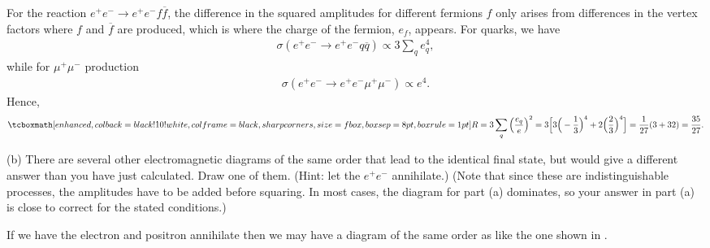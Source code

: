 For the reaction $e^{+}e^{-} \rightarrow e^{+}e^{-}f\overline{f}$, the difference in the squared amplitudes for different fermions $f$ only arises from differences in the vertex factors where $f$ and $\overline{f}$ are produced, which is where the charge of the fermion, $e_{f}$, appears.
For quarks, we have 
\begin{eqnarray}
    \label{eq:sigma-quarks}
    \sigma(e^{+}e^{-} \rightarrow e^{+}e^{-}q\overline{q}) \propto 3\sum_{q} e_{q}^4
,\end{eqnarray}
while for $\mu^{+}\mu^{-}$ production
\begin{eqnarray}
    \label{eq:sigma-mu}
    \sigma(e^{+}e^{-} \rightarrow e^{+}e^{-}\mu^{+}\mu^{-}) \propto e^4
.\end{eqnarray}
Hence,
\begin{eqnarray}
    \label{eq:ratio-calculation}
    \eqbox{
    R = 3 \sum_{q} \Big( \frac{e_{q}}{e} \Big)^2 = 3\Big[3\Big(-\frac{1}{3}\Big)^4 + 2\Big(\frac{2}{3}\Big)^4\Big] = \frac{1}{27}(3 + 32) = \frac{35}{27}
}
.\end{eqnarray}



(b) There are several other electromagnetic diagrams of the same order that lead to the identical final state, but would give a different answer than you have just calculated.
Draw one of them. (Hint: let the $e^{+}e^{-}$ annihilate.)
(Note that since these are indistinguishable processes, the amplitudes have to be added before squaring.
In most cases, the diagram for part (a) dominates, so your answer in part (a) is close to correct for the stated conditions.)

If we have the electron and positron annihilate then we may have a diagram of the same order as  like the one shown in .


